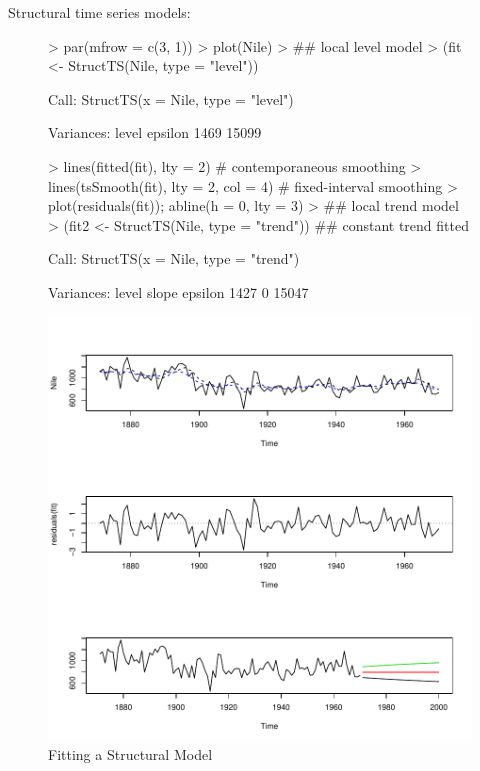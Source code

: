 \documentclass[11pt, a4paper]{article} %
\begin{document}
Structural time series models:
\begin{figure}[H]
\centering
\begin{Schunk}
\begin{Sinput}
> par(mfrow = c(3, 1))
> plot(Nile)
> ## local level model
> (fit <- StructTS(Nile, type = "level"))
\end{Sinput}
\begin{Soutput}
Call:
StructTS(x = Nile, type = "level")

Variances:
  level  epsilon  
   1469    15099  
\end{Soutput}
\begin{Sinput}
> lines(fitted(fit), lty = 2)              # contemporaneous smoothing
> lines(tsSmooth(fit), lty = 2, col = 4)   # fixed-interval smoothing
> plot(residuals(fit)); abline(h = 0, lty = 3)
> ## local trend model
> (fit2 <- StructTS(Nile, type = "trend")) ## constant trend fitted
\end{Sinput}
\begin{Soutput}
Call:
StructTS(x = Nile, type = "trend")

Variances:
  level    slope  epsilon  
   1427        0    15047  
\end{Soutput}
\end{Schunk}
\includegraphics{sweaveclean-028}
\caption{Fitting a Structural Model}
\end{figure}
\end{document}
